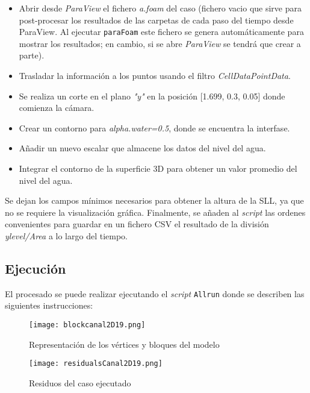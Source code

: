 \begin{itemize}
\begin{itemize}
    \begin{itemize}
    \item
      Abrir desde \emph{ParaView} el fichero \emph{a.foam} del caso
      (fichero vacio que sirve para post-procesar los resultados de las
      carpetas de cada paso del tiempo desde ParaView. Al ejecutar
      \texttt{paraFoam} este fichero se genera automáticamente para
      mostrar los resultados; en cambio, si se abre \emph{ParaView} se
      tendrá que crear a parte).
    \item
      Trasladar la información a los puntos usando el filtro
      \emph{CellDataPointData}.
    \item
      Se realiza un corte en el plano \emph{"y"} en la posición
      {[}1.699, 0.3, 0.05{]} donde comienza la cámara.
    \item
      Crear un contorno para \emph{alpha.water=0.5}, donde se encuentra
      la interfase.
    \item
      Añadir un nuevo escalar que almacene los datos del nivel del agua.
    \item
      Integrar el contorno de la superficie 3D para obtener un valor
      promedio del nivel del agua.
    \end{itemize}

    Se dejan los campos mínimos necesarios para obtener la altura de la
    SLL, ya que no se requiere la visualización gráfica. Finalmente, se
    añaden al \emph{script} las ordenes convenientes para guardar en un
    fichero CSV el resultado de la división \emph{ylevel/Area} a lo
    largo del tiempo.
  \end{itemize}
\end{itemize}

\subsection{Ejecución}\label{header-n140}

El procesado se puede realizar ejecutando el \emph{script}
\texttt{Allrun} donde se describen las siguientes instrucciones:

\begin{figure}
\centering
\texttt{[image: blockcanal2D19.png]}
\caption{Representación de los vértices y bloques del modelo}
\label{fig:blockcanal2D19}
\end{figure}

\begin{figure}
\centering
\texttt{[image: residualsCanal2D19.png]}
\caption{Residuos del caso ejecutado}
\label{fig:residualsCanal2D19}
\end{figure}

